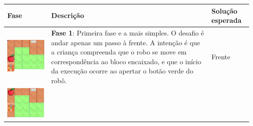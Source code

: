 \begin{quadro}[htbp]
    \label{quadro:fases_programacao}
    \begin{longtable}{ | m{} | m{} | m{} | }
        \hline
        \textbf{Fase}  & \textbf{Descrição} & \textbf{Solução esperada} \\ \hline
        \endhead
        
    
        \includegraphics[width=.9\linewidth]{figs/prog/1.png} &
    
        \textbf{Fase 1}: 
        Primeira fase e a mais simples. O desafio é andar apenas um passo à frente. A intenção é que a criança compreenda que o robo se move em correspondência ao bloco encaixado, e que o início da execução ocorre ao apertar o botão verde do robô. &
        
        Frente

        \\ \hline
    
    
        \includegraphics[width=.9\linewidth]{figs/prog/2.png} &
    

\end{longtable}
\end{quadro}
